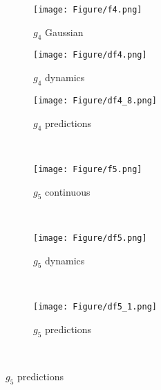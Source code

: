 \begin{figure}[htbp]
    \begin{subfigure}[b]{0.3\textwidth}
        \texttt{[image: Figure/f4.png]}
        \caption{$g_4$ Gaussian}
        \label{app:fig:f4}
    \end{subfigure}
    \begin{subfigure}[b]{0.3\textwidth}
        \texttt{[image: Figure/df4.png]}
        \caption{$g_4$ dynamics}
        \label{app:fig:df4}
    \end{subfigure}
    \begin{subfigure}[b]{0.3\textwidth}
        \texttt{[image: Figure/df4\_8.png]}
        \caption{$g_4$ predictions}
        \label{app:fig:f4}
    \end{subfigure}\\ %

        \begin{subfigure}[b]{0.3\textwidth}
        \texttt{[image: Figure/f5.png]}
        \caption{$g_5$ continuous}
        \label{app:fig:f5}
    \end{subfigure}
    ~ %
    \begin{subfigure}[b]{0.3\textwidth}
        \texttt{[image: Figure/df5.png]}
        \caption{$g_5$ dynamics}
        \label{app:fig:df5}
    \end{subfigure}
    ~ %
    \begin{subfigure}[b]{0.3\textwidth}
        \texttt{[image: Figure/df5\_1.png]}
        \caption{$g_5$ predictions}
        \label{app:fig:df5}
    \end{subfigure}\\ %


\end{figure}
